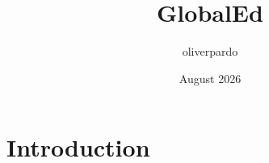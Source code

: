 \documentclass{article}
\title{GlobalEd}
\author{oliverpardo }
\date{August 2026}
\begin{document}
\maketitle

\section{Introduction}
\end{document}
